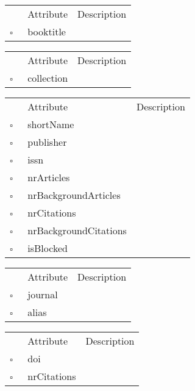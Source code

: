 \begin{table}
\caption{InBook  }

\begin{longtable}{llp{8cm}}
& Attribute & Description \\
$\square$\ & booktitle &  \\
\end{longtable}
\label{attr:InBook}
\end{table}

\clearpage
\begin{table}
\caption{InCollection  }

\begin{longtable}{llp{8cm}}
& Attribute & Description \\
$\square$\ & collection &  \\
\end{longtable}
\label{attr:InCollection}
\end{table}

\begin{table}
\caption{Journal  }

\begin{longtable}{llp{8cm}}
& Attribute & Description \\
$\square$\ & shortName &  \\
$\square$\ & publisher &  \\
$\square$\ & issn &  \\
$\square$\ & nrArticles &  \\
$\square$\ & nrBackgroundArticles &  \\
$\square$\ & nrCitations &  \\
$\square$\ & nrBackgroundCitations &  \\
$\square$\ & isBlocked &  \\
\end{longtable}
\label{attr:Journal}
\end{table}

\begin{table}
\caption{JournalAlias  }

\begin{longtable}{llp{8cm}}
& Attribute & Description \\
$\square$\ & journal &  \\
$\square$\ & alias &  \\
\end{longtable}
\label{attr:JournalAlias}
\end{table}

\begin{table}
\caption{MissingCitedWork  }

\begin{longtable}{llp{8cm}}
& Attribute & Description \\
$\square$\ & doi &  \\
$\square$\ & nrCitations &  \\
\end{longtable}
\label{attr:MissingCitedWork}
\end{table}

